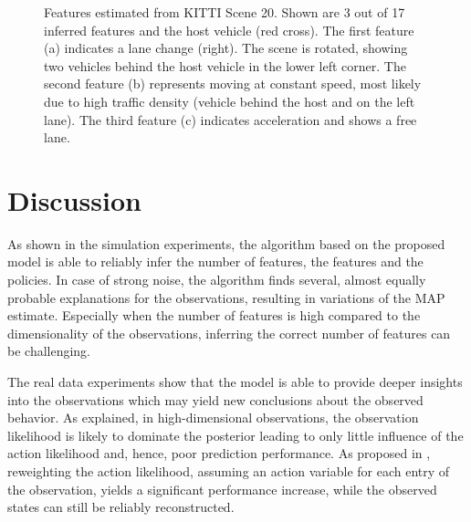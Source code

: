 \documentclass{article}
\begin{document}
\begin{figure}
	\centering 	

	\caption{Features estimated from KITTI Scene 20. Shown are 3 out of 17 inferred features and the host vehicle (red cross). The first feature (a) indicates a lane change (right). The scene is rotated, showing two vehicles behind the host vehicle in the lower left corner. The second feature (b) represents moving at constant speed, most likely due to high traffic density (vehicle behind the host and on the left lane). The third feature (c) indicates acceleration and shows a free lane. }
	\label{fig::res::0020::feats}
\end{figure}


\section{Discussion}
\label{sec::discussion}
As shown in the simulation experiments, the algorithm based on the proposed model is able to reliably infer the number of features, the features and the policies. 
In case of strong noise, the algorithm finds several, almost equally probable explanations for the observations, resulting in variations of the MAP estimate. 
Especially when the number of features is high compared to the dimensionality of the observations, inferring the correct number of features can be challenging.

The real data experiments show that the model is able to provide deeper insights into the observations which may yield new conclusions about the observed behavior. 
As explained, in high-dimensional observations, the observation likelihood is likely to dominate the posterior leading to only little influence of the action likelihood and, hence, poor prediction performance. 
As proposed in , reweighting the action likelihood, assuming an action variable for each entry of the observation, yields a significant performance increase, while the observed states can still be reliably reconstructed.
\end{document}
